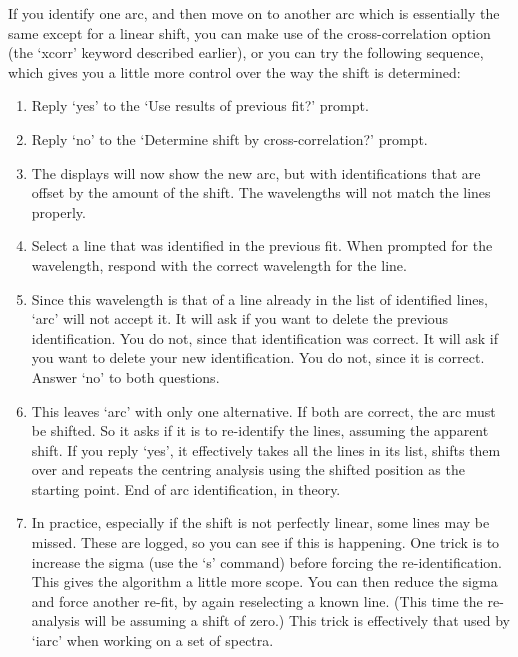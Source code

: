 \documentclass[11pt,twoside]{article}
\newcommand{\htmlref}[2]{#1}
\begin{document}
   If you identify one arc, and then move on to another arc which is
   essentially the same except for a linear shift, you can make use of
   the cross-correlation option (the `xcorr' keyword described
\htmlref{earlier),}{techno10initials}
   or you can try the following sequence, which gives you a little more
   control over the way the shift is determined:

\begin{enumerate}
\item
   Reply `yes' to the `Use results of previous fit?' prompt.
\item
   Reply `no' to the `Determine shift by cross-correlation?' prompt.
\item
   The displays will now show the new arc, but with identifications that
   are offset by the amount of the shift.  The wavelengths will not
   match the lines properly.
\item
   Select a line that was identified in the previous fit.  When prompted
   for the wavelength, respond with the correct wavelength for the line.
\item
   Since this wavelength is that of a line already in the list of
   identified lines, `arc' will not accept it.  It will ask if you want
   to delete the previous identification.  You do not, since that
   identification was correct.  It will ask if you want to delete your
   new identification.  You do not, since it is correct.  Answer `no' to
   both questions.
\item
   This leaves `arc' with only one alternative.  If both are correct,
   the arc must be shifted.  So it asks if it is to re-identify the
   lines, assuming the apparent shift.  If you reply `yes', it effectively
   takes all the lines in its list, shifts them over and repeats the
   centring analysis using the shifted position as the starting point.
   End of arc identification, in theory.
\item
   In practice, especially if the shift is not perfectly linear, some
   lines may be missed.  These are logged, so you can see if this is
   happening.  One trick is to increase the sigma (use the `s' command)
   before forcing the re-identification.  This gives the algorithm a
   little more scope.  You can then reduce the sigma and force another
   re-fit, by again reselecting a known line.  (This time the
   re-analysis will be assuming a shift of zero.)  This trick is
   effectively that used by `iarc' when working on a set of spectra.
\end{enumerate}
\end{document}
